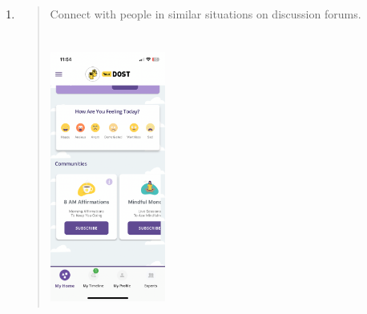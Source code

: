 \documentclass[manuscript,screen,review]{acmart}
\begin{document}
\begin{enumerate}
\def\labelenumi{\arabic{enumi}.}
\setcounter{enumi}{1}
\item
  \begin{quote}
  Connect with people in similar situations on discussion forums.\\
  \strut \\
  \includegraphics[width=1.49474in,height=3.31321in]{vertopal.com_Untitleddocument/vertopal_25c0ff455f73469eb1b6e3e4452807f6/media/image3.png}
  \end{quote}
\end{enumerate}
\end{document}
